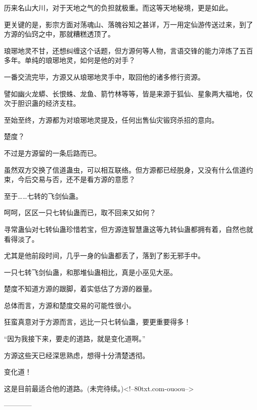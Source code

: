 \begin{this_body}
历来名山大川，对于天地之气的负担就极重。而这等天地秘境，更是如此。

更关键的是，影宗方面对荡魂山、落魄谷知之甚详，万一用定仙游传送过来，到了方源的仙窍之中，那就糟糕透顶了。

琅琊地灵不甘，还想纠缠这个话题，但方源何等人物，言语交锋的能力淬炼了五百多年。单纯的琅琊地灵，如何是他的对手？

一番交流完毕，方源又从琅琊地灵手中，取回他的诸多修行资源。

譬如幽火龙蟒、长恨蛛、龙鱼、箭竹林等等，皆是来源于狐仙、星象两大福地，仅次于胆识蛊的经济支柱。

至始至终，方源都为对琅琊地灵提及，任何出售仙灾锻窍杀招的意向。

楚度？

不过是方源留的一条后路而已。

虽然双方交换了信道蛊虫，可以相互联络。但方源都已经脱身，又没有什么信道约束，今后交易与否，还不是看方源的意愿？

至于……七转的飞剑仙蛊。

呵呵，区区一只七转仙蛊而已，取不回来又如何？

寻常蛊仙对七转仙蛊珍惜若宝，但方源连智慧蛊这等九转仙蛊都拥有着，自然也就看得淡了。

尤其是他前段时间，几乎一身的仙蛊都丢了，落到了影无邪手中。

一只七转飞剑仙蛊，和那堆仙蛊相比，真是小巫见大巫。

楚度不知道方源的跟脚，着实低估了方源的器量。

总体而言，方源和楚度交易的可能性很小。

狂蛮真意对于方源而言，远比一只七转仙蛊，要更重要得多！

“因为我接下来，要走的道路，就是变化道啊。”

方源这些天已经深思熟虑，想得十分清楚透彻。

变化道！

这是目前最适合他的道路。(未完待续。)<!--80txt.com-ouoou-->

------------

\end{this_body}

